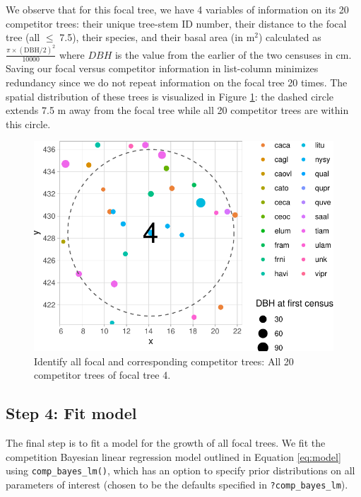 \documentclass[12pt]{article}
\newenvironment{Shaded}{\begin{snugshade}}{\end{snugshade}}
\newcommand{\DataTypeTok}[1]{\textcolor[rgb]{0.13,0.29,0.53}{#1}}
\newcommand{\KeywordTok}[1]{\textcolor[rgb]{0.13,0.29,0.53}{\textbf{#1}}}
\newcommand{\NormalTok}[1]{#1}
\newcommand{\OperatorTok}[1]{\textcolor[rgb]{0.81,0.36,0.00}{\textbf{#1}}}
\newcommand{\OtherTok}[1]{\textcolor[rgb]{0.56,0.35,0.01}{#1}}
\newcommand{\StringTok}[1]{\textcolor[rgb]{0.31,0.60,0.02}{#1}}
\begin{document}
We observe that for this focal tree, we have 4 variables of information
on its 20 competitor trees: their unique tree-stem ID number, their
distance to the focal tree (all \(\leq\) 7.5), their species, and their
basal area (in m\(^2\)) calculated as
\(\frac{\pi \times (\text{DBH/2})^2}{10000}\) where \(DBH\) is the value
from the earlier of the two censuses in cm. Saving our focal versus
competitor information in list-column minimizes redundancy since we do
not repeat information on the focal tree 20 times. The spatial
distribution of these trees is visualized in Figure
\ref{fig:scbi-focal-vs-comp-map}: the dashed circle extends 7.5 m away
from the focal tree while all 20 competitor trees are within this
circle.

\begin{figure}

{\centering \includegraphics[width=0.66\linewidth]{Figures/scbi-focal-vs-comp-map-1} 

}

\caption{Identify all focal and corresponding competitor trees: All 20 competitor trees of focal tree 4.}\label{fig:scbi-focal-vs-comp-map}
\end{figure}

\hypertarget{model-fit-predict}{%
\subsection{Step 4: Fit model}\label{model-fit-predict}}

The final step is to fit a model for the growth of all focal trees. We
fit the competition Bayesian linear regression model outlined in
Equation \ref{eq:model} using \texttt{comp\_bayes\_lm()}, which has an
option to specify prior distributions on all parameters of interest
(chosen to be the defaults specified in \texttt{?comp\_bayes\_lm}).

\begin{Shaded}
\end{Shaded}
\end{document}
